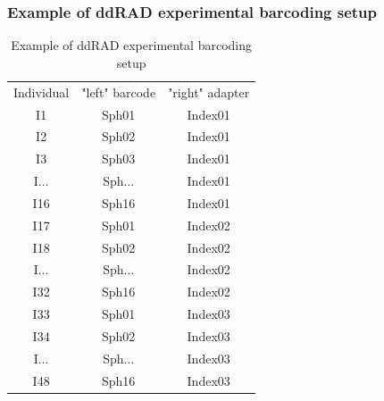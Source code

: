 \documentclass[11pt, oneside]{article}
\begin{document}
\subsubsection {Example of ddRAD experimental barcoding setup}
\begin{table}[]
\caption{Example of ddRAD experimental barcoding setup}
\begin{center}
\begin{tabular}{c|c|c|}
Individual & "left" barcode & "right" adapter \\
I1 & Sph01 & Index01 \\
I2 & Sph02 & Index01 \\
I3 & Sph03 & Index01 \\
I... & Sph... & Index01 \\
I16 & Sph16 & Index01 \\
I17 & Sph01 & Index02 \\
I18 & Sph02 & Index02 \\
I... & Sph... & Index02 \\
I32 & Sph16 & Index02 \\
I33 & Sph01 & Index03 \\
I34 & Sph02 & Index03 \\
I... & Sph... & Index03 \\
I48 & Sph16 & Index03 \\
\end{tabular}
\end{center}
\label{default}
\end{table}%
\end{document}
